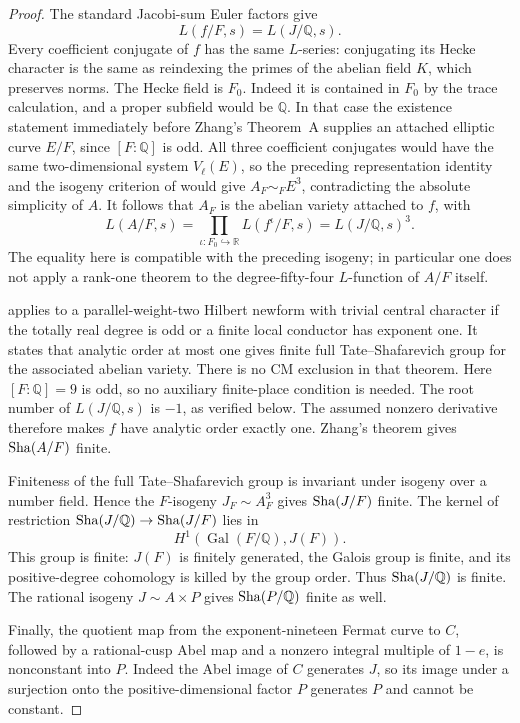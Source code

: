 \begin{proof}
The standard Jacobi-sum Euler factors give
\[
 L(f/F,s)=L(J/\mathbb Q,s).
\]
Every coefficient conjugate of $f$ has the same $L$-series:
conjugating its Hecke character is the same as reindexing
the primes of the abelian field $K$, which preserves norms.
The Hecke field is $F_0$.  Indeed it is contained in $F_0$
by the trace calculation, and a proper subfield would be
$\mathbb Q$.  In that case the existence statement immediately
before Zhang's Theorem~A supplies an attached elliptic curve
$E/F$, since $[F:\mathbb Q]$ is odd.  All three coefficient
conjugates would have the same two-dimensional system
$V_\ell(E)$, so the preceding representation identity and
the isogeny criterion of \citet[\S5, Corollary~2, p.~22]{Faltings1986} would give $A_F\sim_F E^3$,
contradicting the absolute simplicity of $A$.
It follows that $A_F$ is the abelian variety attached to
$f$, with
\[
 L(A/F,s)=\prod_{\iota:F_0\hookrightarrow\mathbb R}L(f^\iota/F,s)
          =L(J/\mathbb Q,s)^3.
\]
The equality here is compatible with the preceding isogeny;
in particular one does not apply a rank-one theorem to the
degree-fifty-four $L$-function of $A/F$ itself.

\citet[Theorem~A, p.~28; proof in \S7.2, p.~143]{Zhang2001}
applies to a parallel-weight-two Hilbert newform with trivial
central character if the totally real degree is odd or a
finite local conductor has exponent one.  It states that
analytic order at most one gives finite full
Tate--Shafarevich group for the associated abelian variety.
There is no CM exclusion in that theorem.  Here $[F:\mathbb Q]=9$
is odd, so no auxiliary finite-place condition is needed.
The root number of $L(J/\mathbb Q,s)$ is $-1$, as verified
below.  The assumed nonzero derivative therefore makes
$f$ have analytic order exactly one.  Zhang's theorem gives
$\operatorname{Sha}(A/F)$ finite.

Finiteness of the full Tate--Shafarevich group is invariant
under isogeny over a number field.  Hence the $F$-isogeny
$J_F\sim A_F^3$ gives $\operatorname{Sha}(J/F)$ finite.
The kernel of restriction
$\operatorname{Sha}(J/\mathbb Q)\to\operatorname{Sha}(J/F)$ lies in
\[
 H^1(\operatorname{Gal}(F/\mathbb Q),J(F)).
\]
This group is finite: $J(F)$ is finitely generated, the
Galois group is finite, and its positive-degree cohomology
is killed by the group order.  Thus $\operatorname{Sha}(J/\mathbb Q)$ is
finite.  The rational isogeny $J\sim A\times P$ gives
$\operatorname{Sha}(P/\mathbb Q)$ finite as well.

Finally, the quotient map from the exponent-nineteen Fermat
curve to $C$, followed by a rational-cusp Abel map and a
nonzero integral multiple of $1-e$, is nonconstant into $P$.
Indeed the Abel image of $C$ generates $J$, so its image
under a surjection onto the positive-dimensional factor
$P$ generates $P$ and cannot be constant.
\end{proof}

